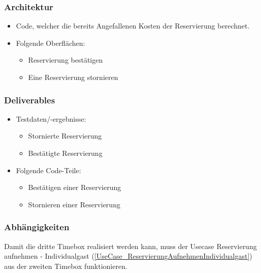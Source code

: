 \subsubsection{Architektur}
\begin{itemize}
	\item Code, welcher die bereits Angefallenen Kosten der \Gls{Reservierung} berechnet.
	\item Folgende Oberflächen:
	\begin{itemize}
		\item \Gls{Reservierung} bestätigen
		\item Eine \Gls{Reservierung} stornieren
	\end{itemize}
\end{itemize}
\subsubsection{Deliverables}
\begin{itemize}
	\item Testdaten/-ergebnisse:
	\begin{itemize}
		\item Stornierte \Gls{Reservierung}
		\item Bestätigte \Gls{Reservierung}
	\end{itemize}
	\item Folgende Code-Teile:
	\begin{itemize}
		\item Bestätigen einer \Gls{Reservierung}
		\item Stornieren einer \Gls{Reservierung}
	\end{itemize}
\end{itemize}

\subsubsection{Abhängigkeiten}
Damit die dritte Timebox realisiert werden kann, muss der Usecase Reservierung aufnehmen - Individualgast (\ref{UseCase_ReservierungAufnehmenIndividualgast}) aus der zweiten Timebox funktionieren.
